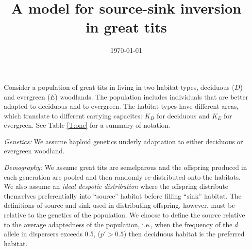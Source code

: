 \documentclass[11pt, reqno]{amsart}
\title{A model for source-sink inversion in great tits}
\author{}
\date{\today}
\begin{document}
\maketitle

Consider a population of great tits in living in two habitat types, deciduous ($D$) and evergreen ($E$) woodlands. 
The population includes individuals that are better adapted to deciduous and to evergreen. 
The habitat types have different areas, which translate to different carrying capacites: $K_D$ for  deciduous and $K_E$ for evergreen.
See Table \ref{T:one} for a summary of notation.

{\em Genetics:} We assume haploid genetics underly adaptation to either deciduous or evergreen woodland. 

{\em Demography:} We assume great tits are semelparous and the offspring produced in each generation are pooled and then randomly re-distributed onto the habitats. 
We also assume an {\em ideal despotic distribution} where the offspring distribute themselves preferentially into ``source'' habitat before filling ``sink'' habitat. 
The definitions of source and sink used in distributing offspring, however, must be relative to the genetics of the population. 
We choose to define the source relative to the average adaptedness of the population, i.e., when the frequency of the $d$ allele in dispersers exceeds 0.5, ($p' > 0.5$) then deciduous habitat is the preferred habitat.
\end{document}
